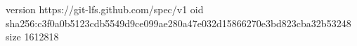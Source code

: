 version https://git-lfs.github.com/spec/v1
oid sha256:c3f0a0b5123cdb5549d9ce099ae280a47e032d15866270e3bd823cba32b53248
size 1612818
